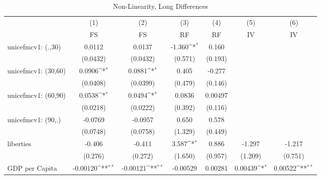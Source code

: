 \begin{table}[htbp]\centering
\def\sym#1{\ifmmode^{#1}\else\(^{#1}\)\fi}
\caption{Non-Linearity, Long Differences}
\begin{tabular}{l*{6}{c}}
\toprule
                &\multicolumn{1}{c}{(1)}&\multicolumn{1}{c}{(2)}&\multicolumn{1}{c}{(3)}&\multicolumn{1}{c}{(4)}&\multicolumn{1}{c}{(5)}&\multicolumn{1}{c}{(6)}\\
                &\multicolumn{1}{c}{FS}&\multicolumn{1}{c}{FS}&\multicolumn{1}{c}{RF}&\multicolumn{1}{c}{RF}&\multicolumn{1}{c}{IV}&\multicolumn{1}{c}{IV}\\
\midrule
unicefmcv1: (.,30)&   0.0112         &   0.0137         &   -1.360\sym{*}  &    0.160         &                  &                  \\
                & (0.0432)         & (0.0432)         &  (0.571)         &  (0.193)         &                  &                  \\
\addlinespace
unicefmcv1: (30,60)&   0.0906\sym{*}  &   0.0881\sym{*}  &    0.405         &   -0.277         &                  &                  \\
                & (0.0408)         & (0.0399)         &  (0.479)         &  (0.146)         &                  &                  \\
\addlinespace
unicefmcv1: (60,90)&   0.0538\sym{*}  &   0.0494\sym{*}  &   0.0836         &  0.00497         &                  &                  \\
                & (0.0218)         & (0.0222)         &  (0.392)         &  (0.116)         &                  &                  \\
\addlinespace
unicefmcv1: (90,.)&  -0.0769         &  -0.0957         &    0.650         &    0.578         &                  &                  \\
                & (0.0748)         & (0.0758)         &  (1.329)         &  (0.449)         &                  &                  \\
\addlinespace
liberties       &   -0.406         &   -0.411         &    3.587\sym{*}  &    0.886         &   -1.297         &   -1.217         \\
                &  (0.276)         &  (0.272)         &  (1.650)         &  (0.957)         &  (1.209)         &  (0.751)         \\
\addlinespace
GDP per Capita  & -0.00120\sym{**} & -0.00121\sym{**} & -0.00529         &  0.00281         &  0.00439\sym{*}  &  0.00522\sym{**} \\

\end{tabular}
\end{table}

